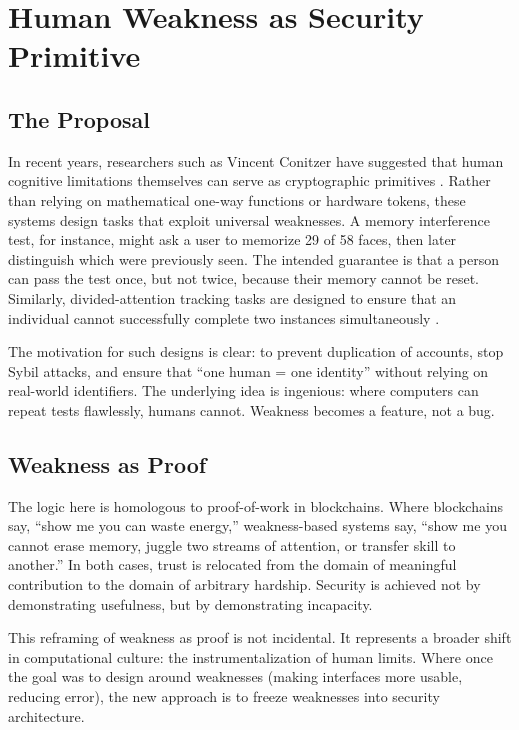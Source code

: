 \documentclass{book}
\begin{document}
\chapter{Human Weakness as Security Primitive}

\section{The Proposal}

In recent years, researchers such as Vincent Conitzer have suggested that human cognitive limitations themselves can serve as cryptographic primitives \cite{conitzer2020}. Rather than relying on mathematical one-way functions or hardware tokens, these systems design tasks that exploit universal weaknesses. A memory interference test, for instance, might ask a user to memorize 29 of 58 faces, then later distinguish which were previously seen. The intended guarantee is that a person can pass the test once, but not twice, because their memory cannot be reset. Similarly, divided-attention tracking tasks are designed to ensure that an individual cannot successfully complete two instances simultaneously \cite{eriksen1985, mccormick1990, jans2010}.

The motivation for such designs is clear: to prevent duplication of accounts, stop Sybil attacks, and ensure that “one human = one identity” without relying on real-world identifiers. The underlying idea is ingenious: where computers can repeat tests flawlessly, humans cannot. Weakness becomes a feature, not a bug.

\section{Weakness as Proof}

The logic here is homologous to proof-of-work in blockchains. Where blockchains say, “show me you can waste energy,” weakness-based systems say, “show me you cannot erase memory, juggle two streams of attention, or transfer skill to another.” In both cases, trust is relocated from the domain of meaningful contribution to the domain of arbitrary hardship. Security is achieved not by demonstrating usefulness, but by demonstrating incapacity.

This reframing of weakness as proof is not incidental. It represents a broader shift in computational culture: the instrumentalization of human limits. Where once the goal was to design around weaknesses (making interfaces more usable, reducing error), the new approach is to freeze weaknesses into security architecture.
\end{document}
